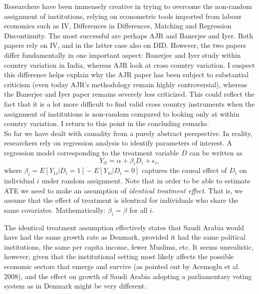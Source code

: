 \documentclass[12pt]{article}%
\begin{document}
Researchers have been immensely creative in trying to overcome the non-random assignment of institutions, relying on econometric tools imported from labour economics such as IV, Differences in Differences, Matching and Regression Discontinuity. The most successful are perhaps AJR and Banerjee and Iyer. Both papers rely on IV, and in the latter case also on DID. However, the two papers differ fundamentally in one important aspect: Banerjee and Iyer study within country variation in India, whereas AJR look at cross country variation. I suspect this difference helps explain why the AJR paper has been subject to substantial criticism (even today AJR's methodology remain highly controversial), whereas the Banerjee and Iyer paper remains severely less criticized. This could reflect the fact that it is a lot more difficult to find valid cross country instruments when the assignment of institutions is non-random compared to looking only at within country variation. I return to this point in the concluding remarks. \\

So far we have dealt with causality from a purely abstract perspective. In reality, researchers rely on regression analysis to identify parameters of interest. A regression model corresponding to the treatment variable $D$ can be written as
\begin{equation}
Y_{it}=\alpha+\beta_iD_i+\epsilon_i,
\end{equation}
where $\beta_i=E[Y_{1i}|D_i=1]-E[Y_{1i}|D_i=0]$ captures the causal effect of $D_i$ on individual $i$ under random assignment. Note that in order to be able to estimate ATE we need to make an assumption of \textit{identical treatment effect}. That is, we assume that the effect of treatment is identical for individuals who share the same covariates. Mathematically: $\beta_i=\beta$ for all $i$. 

The identical treatment assumption effectively states that Saudi Arabia would have had  the same growth rate as Denmark, provided it had the same political institutions, the same per capita income, fewer Muslims, etc. It seems unrealistic, however, given that the institutional setting most likely affects the possible economic sectors that emerge and survive (as pointed out by Acemoglu et al. 2008), and the effect on growth of Saudi Arabia adopting a parliamentary voting system as in Denmark might be very different. \\
\end{document}

